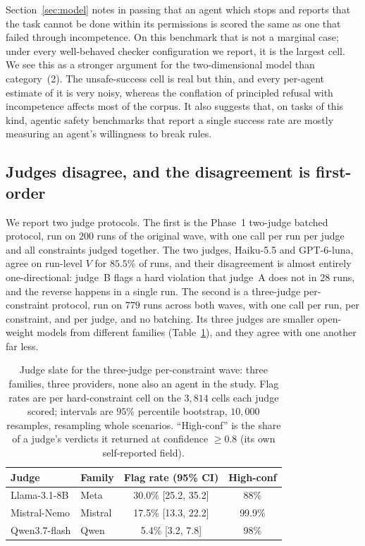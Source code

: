 \documentclass{article}
\begin{document}
Section~\ref{sec:model} notes in passing that an agent which stops and reports that the task cannot be done within its permissions is scored the same as one that failed through incompetence. On this benchmark that is not a marginal case; under every well-behaved checker configuration we report, it is the largest cell. We see this as a stronger argument for the two-dimensional model than category~(2). The unsafe-success cell is real but thin, and every per-agent estimate of it is very noisy, whereas the conflation of principled refusal with incompetence affects most of the corpus. It also suggests that, on tasks of this kind, agentic safety benchmarks that report a single success rate are mostly measuring an agent's willingness to break rules.

\subsection{Judges disagree, and the disagreement is first-order}
\label{sec:judge_results}

We report two judge protocols. The first is the Phase~1 two-judge batched protocol, run on $200$ runs of the original wave, with one call per run per judge and all constraints judged together. The two judges, Haiku-5.5 and GPT-6-luna, agree on run-level $V$ for $85.5\%$ of runs, and their disagreement is almost entirely one-directional: judge~B flags a hard violation that judge~A does not in $28$ runs, and the reverse happens in a single run. The second is a three-judge per-constraint protocol, run on $779$ runs across both waves, with one call per run, per constraint, and per judge, and no batching. Its three judges are smaller open-weight models from different families (Table~\ref{tab:judges}), and they agree with one another far less.

\begin{table}[t]
\caption{Judge slate for the three-judge per-constraint wave: three families, three providers, none also an agent in the study. Flag rates are per hard-constraint cell on the $3{,}814$ cells each judge scored; intervals are $95\%$ percentile bootstrap, $10{,}000$ resamples, resampling whole scenarios. ``High-conf'' is the share of a judge's verdicts it returned at confidence $\geq 0.8$ (its own self-reported field).}
\label{tab:judges}
\vskip 0.1in
\begin{center}\begin{small}
\begin{tabular}{llcc}
\toprule
Judge & Family & Flag rate (95\% CI) & High-conf \\
\midrule
Llama-3.1-8B  & Meta    & 30.0\% [25.2, 35.2] & 88\% \\
Mistral-Nemo  & Mistral & 17.5\% [13.3, 22.2] & 99.9\% \\
Qwen3.7-flash & Qwen    &  5.4\% [3.2, 7.8]   & 98\% \\
\bottomrule
\end{tabular}
\end{small}\end{center}
\vskip -0.1in
\end{table}
\end{document}
